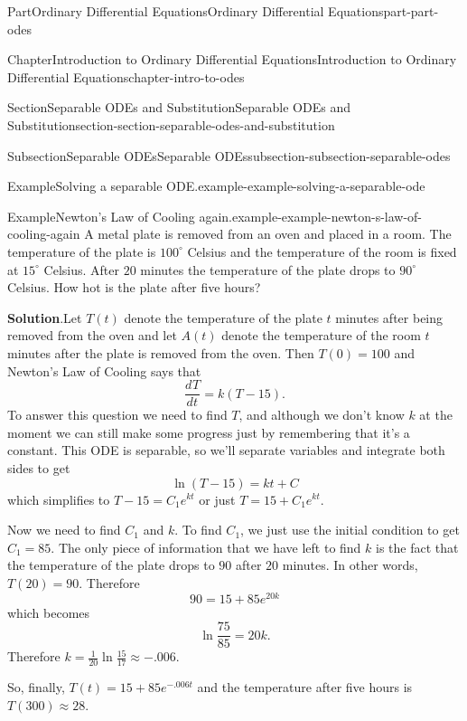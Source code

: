 \documentclass[twoside,10pt,]{book}
\newcommand{\blocktitlefont}{\relax}
\numberwithin{equation}{part}
\newcommand{\dv}[3][]{\dfrac{d^{#1} #2}{d #3^{#1}}}
\begin{document}
\begin{partptx}{Part}{Ordinary Differential Equations}{}{Ordinary Differential Equations}{}{}{part-part-odes}
\begin{chapterptx}{Chapter}{Introduction to Ordinary Differential Equations}{}{Introduction to Ordinary Differential Equations}{}{}{chapter-intro-to-odes}
\begin{sectionptx}{Section}{Separable ODEs and Substitution}{}{Separable ODEs and Substitution}{}{}{section-section-separable-odes-and-substitution}
\begin{subsectionptx}{Subsection}{Separable ODEs}{}{Separable ODEs}{}{}{subsection-subsection-separable-odes}
\begin{example}{Example}{Solving a separable ODE.}{example-example-solving-a-separable-ode}
\end{example}
\begin{example}{Example}{Newton's Law of Cooling again.}{example-example-newton-s-law-of-cooling-again}%
A metal plate is removed from an oven and placed in a room. The temperature of the plate is \(100^{\circ}\) Celsius and the temperature of the room is fixed at \(15^{\circ}\) Celsius. After \(20\) minutes the temperature of the plate drops to \(90^{\circ}\) Celsius. How hot is the plate after five hours?%
\par\smallskip%
\noindent\textbf{\blocktitlefont Solution}.\hypertarget{solution-example-newton-s-law-of-cooling-again-c}{}\quad{}Let \(T(t)\) denote the temperature of the plate \(t\) minutes after being removed from the oven and let \(A(t)\) denote the temperature of the room \(t\) minutes after the plate is removed from the oven. Then \(T(0) = 100\) and Newton's Law of Cooling says that%
%
\begin{equation*}
\dv{T}{t} = k(T-15).
\end{equation*}
To answer this question we need to find \(T\), and although we don't know \(k\) at the moment we can still make some progress just by remembering that it's a constant. This ODE is separable, so we'll separate variables and integrate both sides to get%
\begin{equation*}
\ln(T-15) = kt+C
\end{equation*}
which simplifies to \(T-15 = C_{1}e^{kt}\) or just \(T = 15+C_{1}e^{kt}\).%
\par
Now we need to find \(C_{1}\) and \(k\). To find \(C_{1}\), we just use the initial condition to get \(C_{1} = 85\). The only piece of information that we have left to find \(k\) is the fact that the temperature of the plate drops to \(90\) after \(20\) minutes. In other words, \(T(20) = 90\). Therefore%
\begin{equation*}
90 = 15+85e^{20k}
\end{equation*}
which becomes%
\begin{equation*}
\ln\frac{75}{85} = 20k\text{.}
\end{equation*}
Therefore \(k = \frac{1}{20}\ln\frac{15}{17}\approx-.006.\)%
\par
So, finally, \(T(t) = 15+85e^{-.006t}\) and the temperature after five hours is \(T(300)\approx28\).%
\end{example}
\end{subsectionptx}
%
%
\typeout{************************************************}

\end{sectionptx}
\end{chapterptx}
\end{partptx}
\end{document}
